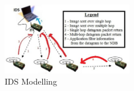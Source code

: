\documentclass[conference,manuscript]{IEEEtran}
\begin{document}
\begin{figure}[btp]
    \centering
    \includegraphics[width=0.5\textwidth]{IDS}
    \caption{IDS Modelling}
    \label{fig:ids_model}
\end{figure}
\end{document}
